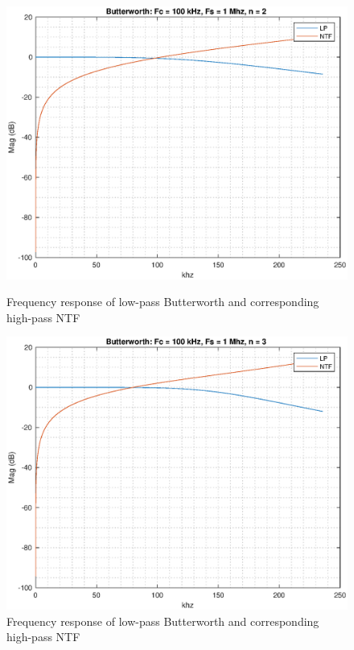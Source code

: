 \documentclass[a4paper]{article}
\begin{document}
\begin{figure}[!h]
	\centering
	\begin{minipage}{0.45\linewidth}
		\centering
		\includegraphics[scale = 0.45]{plots/but_lp_ntf_2_100_1000.eps}
		\caption{Frequency response of low-pass Butterworth and  corresponding high-pass  NTF}
	\end{minipage}
	\hfil
	\begin{minipage}{0.45\linewidth}
		\centering
		\includegraphics[scale = 0.45]{plots/but_lp_ntf_3_100_1000.eps}
		\caption{Frequency response of low-pass Butterworth and  corresponding high-pass  NTF}
	\end{minipage}
\end{figure}
\end{document}
